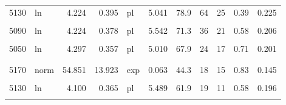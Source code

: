 \documentclass[
  12pt,
  a4paper, twoside]{book}
\begin{document}
\begin{landscape}
\begin{table}
\begin{tabular}[t]{llrrlrrrrrr}
\hspace{1em}5130 & ln & 4.224 & 0.395 & pl & 5.041 & 78.9 & 64 & 25 & 0.39 & 0.225\\
\hspace{1em}\cellcolor{gray!6}{5110} & \cellcolor{gray!6}{ln} & \cellcolor{gray!6}{4.281} & \cellcolor{gray!6}{0.368} & \cellcolor{gray!6}{pl} & \cellcolor{gray!6}{4.907} & \cellcolor{gray!6}{81.3} & \cellcolor{gray!6}{49} & \cellcolor{gray!6}{19} & \cellcolor{gray!6}{0.39} & \cellcolor{gray!6}{0.215}\\
\hspace{1em}5090 & ln & 4.224 & 0.378 & pl & 5.542 & 71.3 & 36 & 21 & 0.58 & 0.206\\
\hspace{1em}\cellcolor{gray!6}{5070} & \cellcolor{gray!6}{norm} & \cellcolor{gray!6}{75.086} & \cellcolor{gray!6}{25.864} & \cellcolor{gray!6}{exp} & \cellcolor{gray!6}{0.044} & \cellcolor{gray!6}{70.0} & \cellcolor{gray!6}{22} & \cellcolor{gray!6}{14} & \cellcolor{gray!6}{0.64} & \cellcolor{gray!6}{0.197}\\
\hspace{1em}5050 & ln & 4.297 & 0.357 & pl & 5.010 & 67.9 & 24 & 17 & 0.71 & 0.201\\
\addlinespace[0.3em]
\multicolumn{11}{l}{\textbf{Vráble SW*}}\\
\hspace{1em}\cellcolor{gray!6}{5190} & \cellcolor{gray!6}{norm} & \cellcolor{gray!6}{53.755} & \cellcolor{gray!6}{14.740} & \cellcolor{gray!6}{pl} & \cellcolor{gray!6}{7.911} & \cellcolor{gray!6}{52.9} & \cellcolor{gray!6}{10} & \cellcolor{gray!6}{7} & \cellcolor{gray!6}{0.70} & \cellcolor{gray!6}{0.151}\\
\hspace{1em}5170 & norm & 54.851 & 13.923 & exp & 0.063 & 44.3 & 18 & 15 & 0.83 & 0.145\\
\hspace{1em}\cellcolor{gray!6}{5150} & \cellcolor{gray!6}{ln} & \cellcolor{gray!6}{4.186} & \cellcolor{gray!6}{0.375} & \cellcolor{gray!6}{pl} & \cellcolor{gray!6}{8.045} & \cellcolor{gray!6}{87.1} & \cellcolor{gray!6}{13} & \cellcolor{gray!6}{5} & \cellcolor{gray!6}{0.38} & \cellcolor{gray!6}{0.213}\\
\hspace{1em}5130 & ln & 4.100 & 0.365 & pl & 5.489 & 61.9 & 19 & 11 & 0.58 & 0.196\\
\hspace{1em}\cellcolor{gray!6}{5110} & \cellcolor{gray!6}{norm} & \cellcolor{gray!6}{58.895} & \cellcolor{gray!6}{10.918} & \cellcolor{gray!6}{exp} & \cellcolor{gray!6}{0.074} & \cellcolor{gray!6}{48.2} & \cellcolor{gray!6}{13} & \cellcolor{gray!6}{12} & \cellcolor{gray!6}{0.92} & \cellcolor{gray!6}{0.103}\\
\bottomrule
\end{tabular}
\end{table}
\end{landscape}
\end{document}
